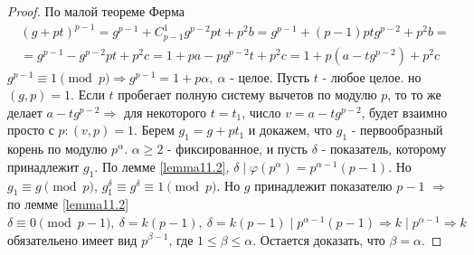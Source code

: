 \documentclass[a4paper, 12pt]{article}
\renewcommand{\phi}{\varphi}
\renewcommand{\div}{\mid}
\theoremstyle{definition}
\begin{document}
    \begin{proof}
        По малой теореме Ферма 
        \begin{multline*}
            (g+pt)^{p-1}=g^{p-1}+C_{p-1}^1 g^{p-2} pt+p^2 b=g^{p-1}+(p-1)ptg^{p-2}+p^2b=\\
            =g^{p-1}-g^{p-2}pt+p^2c=1+pa-pg^{p-2}t+p^2c=1+p(a-tg^{p-2})+p^2c     
        \end{multline*}
        $g^{p-1}\equiv 1\pmod{p} \Rightarrow g^{p-1}=1+p\alpha,\ \alpha$ - целое. Пусть $t$ - любое целое.
        но $(g,p)=1$. Если $t$ пробегает полную систему вычетов по модулю $p$, то то же делает $a-tg^{p-2} \Rightarrow$ для некоторого $t=t_1$, число $v=a-tg^{p-2}$, будет взаимно просто с $p:(v,p)=1$. Берем $g_1=g+pt_1$ и докажем, что $g_1$ - первообразный корень по модулю $p^{\alpha}$. $\alpha\geq 2$ - фиксированное, и пусть $\delta$ - показатель, которому принадлежит $g_1$. По лемме \ref{lemma11.2}, $\delta \div \phi(p^{\alpha})=p^{\alpha-1}(p-1)$. Но $g_1\equiv g\pmod{p}$, $g_1^{\delta}\equiv g^{\delta}\equiv 1\pmod{p}$. Но $g$ принадлежит показателю $p-1$ $\Rightarrow$ по лемме \ref{lemma11.2} $\delta \equiv 0 \pmod{p-1},\ \delta=k(p-1),\ \delta=k(p-1) \div p^{\alpha-1}(p-1) \Rightarrow k\div p^{\alpha-1} \Rightarrow k$ обязательено имеет вид $p^{\beta-1}$, где $1\leq \beta\leq \alpha$. Остается доказать, что $\beta=\alpha$.
    \end{proof} 
    
\end{document}
